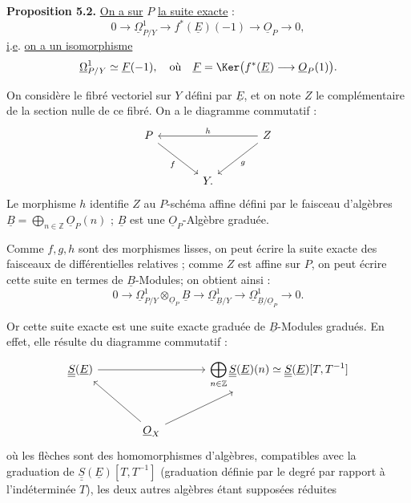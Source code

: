 
\textbf{Proposition 5.2.} \uline{On a sur} \(P\) \uline{la suite exacte} :
\[
0\longrightarrow\underline{\Omega}^1_{P/Y}\longrightarrow f^*(\underline{E})(-1)\longrightarrow\underline{O}_P\longrightarrow0,
\]
\uline{i}.\uline{e}. \uline{on a un isomorphisme}
\[
\underline{\Omega}^1_{P/Y}\simeq \underline{F}(-1),\quad\text{où}\quad \underline{F}=\Ker\bigl(f^*(\underline{E})\longrightarrow\underline{O}_P(1)\bigr).
\]

On considère le fibré vectoriel sur \(Y\) défini par \(\underline{E}\), et on note \(Z\) le complémentaire de la section nulle de ce fibré. On a le diagramme commutatif :
\[
\begin{tikzcd}[column sep=large,row sep=large]
P \arrow[dr,"f"'] && Z \arrow[ll,"h"'] \arrow[dl,"g"]\\
& Y. &
\end{tikzcd}
\]
Le morphisme \(h\) identifie \(Z\) au \(P\)-schéma affine défini par le faisceau d'algèbres \(\underline{B}=\bigoplus_{n\in\mathbb Z}\underline{O}_P(n)\) ; \(\underline{B}\) est une \(\underline{O}_P\)-Algèbre graduée.

Comme \(f,g,h\) sont des morphismes lisses, on peut écrire la suite exacte des faisceaux de différentielles relatives ; comme \(Z\) est affine sur \(P\), on peut écrire cette suite en termes de \(\underline{B}\)-Modules; on obtient ainsi :
\begin{equation}\tag{5.2.1}
0\longrightarrow
 \underline{\Omega}^1_{P/Y}\otimes_{\underline{O}_P}\underline{B}
\longrightarrow
 \underline{\Omega}^1_{\underline{B}/Y}
\longrightarrow
 \underline{\Omega}^1_{\underline{B}/\underline{O}_P}
\longrightarrow0 .
\end{equation}

Or cette suite exacte est une suite exacte graduée de \(\underline{B}\)-Modules gradués. En effet, elle résulte du diagramme commutatif :
\[
\begin{tikzcd}[column sep=large,row sep=large]
\underline{\underline{S}}(\underline{E}) \arrow[rr] && \displaystyle\bigoplus_{n\in\mathbb Z}\underline{\underline{S}}(\underline{E})(n)\simeq \underline{\underline{S}}(\underline{E})[T,T^{-1}]\\
& \underline{O}_X \arrow[ul] \arrow[ur] &
\end{tikzcd}
\]
où les flèches sont des homomorphismes d'algèbres, compatibles avec la graduation de \(\underline{\underline{S}}(\underline{E})[T,T^{-1}]\) (graduation définie par le degré par rapport à l'indéterminée \(T\)), les deux autres algèbres étant supposées réduites
